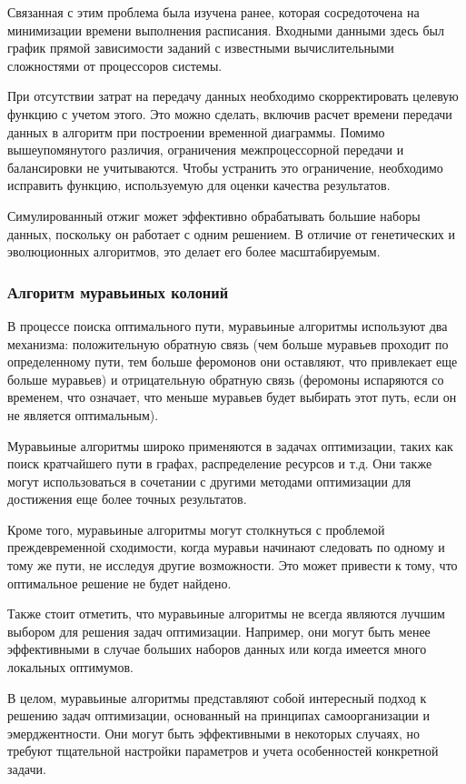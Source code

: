 Связанная с этим проблема была изучена ранее, которая сосредоточена на минимизации времени выполнения расписания. Входными данными здесь был график прямой зависимости заданий с известными вычислительными сложностями от процессоров системы.

При отсутствии затрат на передачу данных необходимо скорректировать целевую функцию с учетом этого. Это можно сделать, включив расчет времени передачи данных в алгоритм при построении временной диаграммы. Помимо вышеупомянутого различия, ограничения межпроцессорной передачи и балансировки не учитываются. Чтобы устранить это ограничение, необходимо исправить функцию, используемую для оценки качества результатов.

Симулированный отжиг может эффективно обрабатывать большие наборы данных, поскольку он работает с одним решением. В отличие от генетических и эволюционных алгоритмов, это делает его более масштабируемым.

\subsubsection{Алгоритм муравьиных колоний}

В процессе поиска оптимального пути, муравьиные алгоритмы используют два механизма: положительную обратную связь (чем больше муравьев проходит по определенному пути, тем больше феромонов они оставляют, что привлекает еще больше муравьев) и отрицательную обратную связь (феромоны испаряются со временем, что означает, что меньше муравьев будет выбирать этот путь, если он не является оптимальным).

Муравьиные алгоритмы широко применяются в задачах оптимизации, таких как поиск кратчайшего пути в графах, распределение ресурсов и т.д. Они также могут использоваться в сочетании с другими методами оптимизации для достижения еще более точных результатов.

Кроме того, муравьиные алгоритмы могут столкнуться с проблемой преждевременной сходимости, когда муравьи начинают следовать по одному и тому же пути, не исследуя другие возможности. Это может привести к тому, что оптимальное решение не будет найдено.

Также стоит отметить, что муравьиные алгоритмы не всегда являются лучшим выбором для решения задач оптимизации. Например, они могут быть менее эффективными в случае больших наборов данных или когда имеется много локальных оптимумов.

В целом, муравьиные алгоритмы представляют собой интересный подход к решению задач оптимизации, основанный на принципах самоорганизации и эмерджентности. Они могут быть эффективными в некоторых случаях, но требуют тщательной настройки параметров и учета особенностей конкретной задачи.

